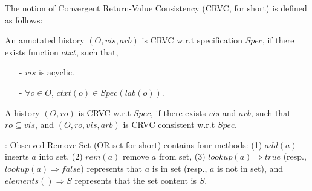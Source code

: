 
The notion of Convergent Return-Value Consistency (CRVC, for short) is defined as follows:

\begin{definition}
\label{definition:strong return value consistency}
An annotated history $(O,\mathit{vis},\mathit{arb})$ is CRVC w.r.t specification $Spec$, if there exists function $ctxt$, such that,

\begin{itemize}
\setlength{\itemsep}{0.5pt}
\item[-] $\mathit{vis}$ is acyclic.

\item[-] $\forall o \in O$, $ctxt(o) \in Spec(lab(o))$.
\end{itemize}

A history $(O,\mathit{ro})$ is CRVC w.r.t $Spec$, if there exists $\mathit{vis}$ and $\mathit{arb}$, such that $\mathit{ro} \subseteq \mathit{vis}$, and $(O,\mathit{ro},\mathit{vis},\mathit{arb})$ is CRVC consistent w.r.t $Spec$.
\end{definition}

: Observed-Remove Set (OR-set for short) \cite{Shapiro:2011,Bieniusa:2012} contains four methods: (1) $add(a)$ inserts $a$ into set, (2) $rem(a)$ remove $a$ from set, (3) $lookup(a)\Rightarrow \mathit{true}$ (resp., $lookup(a)\Rightarrow \mathit{false}$) represents that $a$ is in set (resp., $a$ is not in set), and $elements() \Rightarrow S$ represents that the set content is $S$.


